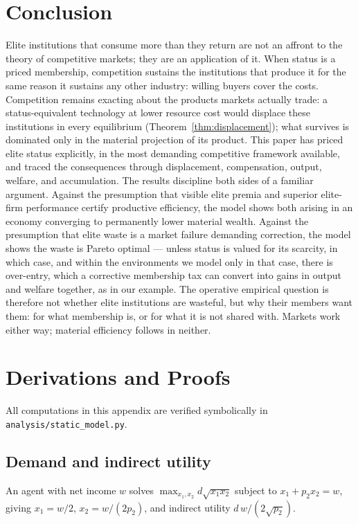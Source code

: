 \documentclass[12pt,letterpaper]{article}
\theoremstyle{definition}
\begin{document}
\section{Conclusion}\label{sec:conclusion}

Elite institutions that consume more than they return are not an affront to the theory of competitive markets; they are an application of it.
When status is a priced membership, competition sustains the institutions that produce it for the same reason it sustains any other industry: willing buyers cover the costs.
Competition remains exacting about the products markets actually trade: a status-equivalent technology at lower resource cost would displace these institutions in every equilibrium (Theorem~\ref{thm:displacement}); what survives is dominated only in the material projection of its product.
This paper has priced elite status explicitly, in the most demanding competitive framework available, and traced the consequences through displacement, compensation, output, welfare, and accumulation.
The results discipline both sides of a familiar argument.
Against the presumption that visible elite premia and superior elite-firm performance certify productive efficiency, the model shows both arising in an economy converging to permanently lower material wealth.
Against the presumption that elite waste is a market failure demanding correction, the model shows the waste is Pareto optimal --- unless status is valued for its scarcity, in which case, and within the environments we model only in that case, there is over-entry, which a corrective membership tax can convert into gains in output and welfare together, as in our example.
The operative empirical question is therefore not whether elite institutions are wasteful, but why their members want them: for what membership is, or for what it is not shared with.
Markets work either way; material efficiency follows in neither.

\appendix

\section{Derivations and Proofs}\label{app:derivations}

All computations in this appendix are verified symbolically in \texttt{analysis/static\_model.py}.

\subsection{Demand and indirect utility}
An agent with net income $w$ solves $\max_{x_1,x_2} d\sqrt{x_1x_2}$ subject to $x_1+p_2x_2=w$, giving $x_1=w/2$, $x_2=w/(2p_2)$, and indirect utility $d\,w/(2\sqrt{p_2})$.
\end{document}
